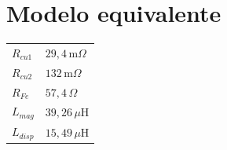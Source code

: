 \documentclass[a4paper,11pt]{article}
\begin{document}
\vspace{5mm}

\section*{Modelo equivalente}

\begin{tabular}{ll}
\toprule
$R_{cu1}$ & $29{,}4\,\text{m}\Omega$ \\
$R_{cu2}$ & $132\,\text{m}\Omega$ \\
$R_{Fe}$ & $57{,}4\,\Omega$ \\
$L_{mag}$ & $39{,}26\,\mu\text{H}$ \\
$L_{disp}$ & $15{,}49\,\mu\text{H}$ \\
\bottomrule
\end{tabular}
\end{document}
